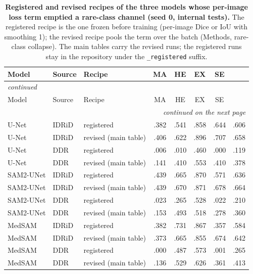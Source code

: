 
{\scriptsize\setlength{\tabcolsep}{3.2pt}\setlength{\LTcapwidth}{\textwidth}\renewcommand{\arraystretch}{1.08}
\begin{longtable}{l l l c c c c c}
\caption{\textbf{Registered and revised recipes of the three models whose per-image loss term emptied a rare-class channel (seed 0, internal tests).} The registered recipe is the one frozen before training (per-image Dice or IoU with smoothing 1); the revised recipe pools the term over the batch (Methods, rare-class collapse). The main tables carry the revised runs; the registered runs stay in the repository under the \texttt{\_registered} suffix.}\label{stab:registered}\\
\toprule
Model & Source & Recipe & MA & HE & EX & SE & \mAUPR{} \\
\midrule
\endfirsthead
\multicolumn{8}{l}{\textit{continued}}\\
\toprule
Model & Source & Recipe & MA & HE & EX & SE & \mAUPR{} \\
\midrule
\endhead
\midrule
\multicolumn{8}{r}{\textit{continued on the next page}}\\
\endfoot
\bottomrule
\endlastfoot
U-Net & IDRiD & registered & .382 & .541 & .858 & .644 & .606 \\
U-Net & IDRiD & revised (main table) & .406 & .622 & .896 & .707 & .658 \\
U-Net & DDR & registered & .006 & .010 & .460 & .000 & .119 \\
U-Net & DDR & revised (main table) & .141 & .410 & .553 & .410 & .378 \\
SAM2-UNet & IDRiD & registered & .439 & .665 & .870 & .571 & .636 \\
SAM2-UNet & IDRiD & revised (main table) & .439 & .670 & .871 & .678 & .664 \\
SAM2-UNet & DDR & registered & .023 & .265 & .528 & .022 & .210 \\
SAM2-UNet & DDR & revised (main table) & .153 & .493 & .518 & .278 & .360 \\
MedSAM & IDRiD & registered & .382 & .731 & .867 & .357 & .584 \\
MedSAM & IDRiD & revised (main table) & .373 & .665 & .855 & .674 & .642 \\
MedSAM & DDR & registered & .000 & .487 & .573 & .001 & .265 \\
MedSAM & DDR & revised (main table) & .136 & .529 & .626 & .361 & .413 \\
\end{longtable}
}
